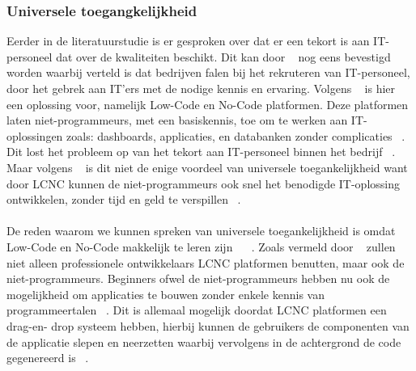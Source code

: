 \subsubsection{Universele toegangkelijkheid}
\label{subsec:universele-toegangkelijkheid}
Eerder in de literatuurstudie is er gesproken over dat er een tekort is aan IT-personeel dat over de kwaliteiten beschikt. 
Dit kan door ~\textcite{Sufi_2023} nog eens bevestigd worden waarbij verteld is dat bedrijven falen bij het rekruteren van IT-personeel, door het gebrek aan 
IT'ers met de nodige kennis en ervaring. Volgens ~\textcite{Sufi_2023} is hier een oplossing voor, namelijk Low-Code en No-Code platformen. 
Deze platformen laten niet-programmeurs, met een basiskennis, toe om te werken aan IT-oplossingen zoals: dashboards, applicaties, 
en databanken zonder complicaties ~\autocite{Sufi_2023}. Dit lost het probleem op van het tekort aan IT-personeel binnen het bedrijf ~\autocite{Sufi_2023}. 
Maar volgens ~\textcite{Sufi_2023} is dit niet de enige voordeel van universele toegankelijkheid want door LCNC kunnen de niet-programmeurs ook snel het 
benodigde IT-oplossing ontwikkelen, zonder tijd en geld te verspillen ~\autocite{Sufi_2023}.
\\
\\
De reden waarom we kunnen spreken van universele toegankelijkheid is omdat Low-Code en No-Code makkelijk te leren zijn ~\autocite{Sufi_2023} ~\autocite{ALSAADI_2021}. 
Zoals vermeld door ~\textcite{ALSAADI_2021} zullen niet alleen professionele ontwikkelaars LCNC platformen benutten, maar ook de niet-programmeurs. 
Beginners ofwel de niet-programmeurs hebben nu ook de mogelijkheid om applicaties te bouwen zonder enkele kennis van programmeertalen ~\autocite{ALSAADI_2021}. 
Dit is allemaal mogelijk doordat LCNC platformen een drag-en- drop systeem hebben, hierbij kunnen 
de gebruikers de componenten van de applicatie slepen en neerzetten waarbij vervolgens in de achtergrond de code gegenereerd is ~\autocite{ALSAADI_2021}.
